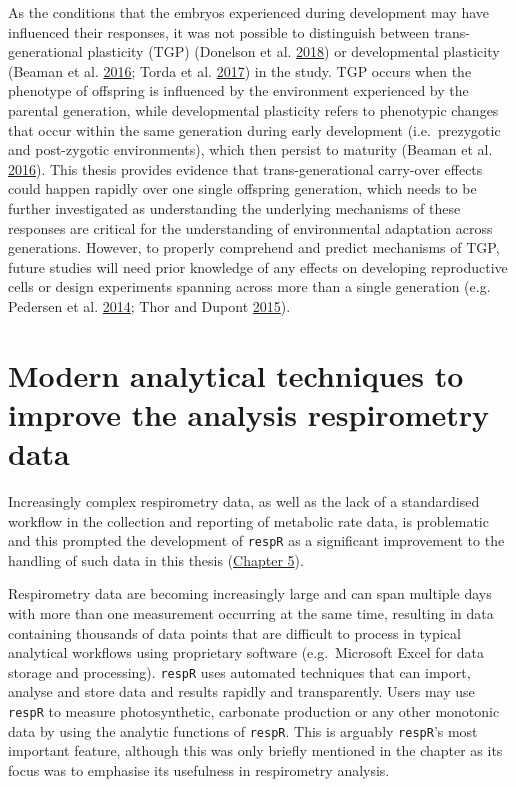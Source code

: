\documentclass[a4paper,10pt, oneside]{memoir}
\begin{document}
As the conditions that the embryos experienced during development may have influenced their responses, it was not possible to distinguish between trans-generational plasticity (TGP) (Donelson et al. \protect\hyperlink{ref-Donelson2018}{2018}) or developmental plasticity (Beaman et al. \protect\hyperlink{ref-Beaman2016}{2016}; Torda et al. \protect\hyperlink{ref-Torda2017}{2017}) in the study.
TGP occurs when the phenotype of offspring is influenced by the environment experienced by the parental generation, while developmental plasticity refers to phenotypic changes that occur within the same generation during early development (i.e.~prezygotic and post-zygotic environments), which then persist to maturity (Beaman et al. \protect\hyperlink{ref-Beaman2016}{2016}).
This thesis provides evidence that trans-generational carry-over effects could happen rapidly over one single offspring generation, which needs to be further investigated as understanding the underlying mechanisms of these responses are critical for the understanding of environmental adaptation across generations.
However, to properly comprehend and predict mechanisms of TGP, future studies will need prior knowledge of any effects on developing reproductive cells or design experiments spanning across more than a single generation (e.g. Pedersen et al. \protect\hyperlink{ref-Pedersen2014}{2014}; Thor and Dupont \protect\hyperlink{ref-Thor2015}{2015}).

\hypertarget{modern-analytical-techniques-to-improve-the-analysis-respirometry-data}{%
\section{Modern analytical techniques to improve the analysis respirometry data}\label{modern-analytical-techniques-to-improve-the-analysis-respirometry-data}}

Increasingly complex respirometry data, as well as the lack of a standardised workflow in the collection and reporting of metabolic rate data, is problematic and this prompted the development of \texttt{respR} as a significant improvement to the handling of such data in this thesis (\protect\hyperlink{package}{Chapter 5}).

Respirometry data are becoming increasingly large and can span multiple days with more than one measurement occurring at the same time, resulting in data containing thousands of data points that are difficult to process in typical analytical workflows using proprietary software (e.g.~Microsoft Excel for data storage and processing).
\texttt{respR} uses automated techniques that can import, analyse and store data and results rapidly and transparently.
Users may use \texttt{respR} to measure photosynthetic, carbonate production or any other monotonic data by using the analytic functions of \texttt{respR}.
This is arguably \texttt{respR}'s most important feature, although this was only briefly mentioned in the chapter as its focus was to emphasise its usefulness in respirometry analysis.
\end{document}
